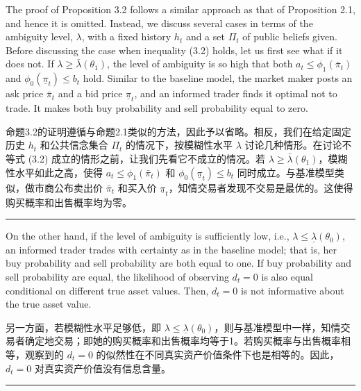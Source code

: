 \documentclass[12pt,a4paper]{article}
\newenvironment{original}{%
  \par\vspace{4pt}\noindent%
  \color{black}%
  \ignorespaces
}{%
  \par\vspace{2pt}%
}
\newenvironment{translation}{%
  \par\vspace{2pt}\noindent%
  \color{transblue}%
  \ignorespaces
}{%
  \par\vspace{4pt}\hrule\vspace{6pt}%
}
\begin{document}
\begin{original}
The proof of Proposition 3.2 follows a similar approach as that of Proposition 2.1, and hence it is omitted. Instead, we discuss several cases in terms of the ambiguity level, $\lambda$, with a fixed history $h_t$ and a set $\Pi_t$ of public beliefs given. Before discussing the case when inequality (3.2) holds, let us first see what if it does not. If $\lambda \geq \bar{\lambda}(\theta_1)$, the level of ambiguity is so high that both $a_t \leq \phi_1(\bar{\pi}_t)$ and $\phi_0(\underline{\pi}_t) \leq b_t$ hold. Similar to the baseline model, the market maker posts an ask price $\bar{\pi}_t$ and a bid price $\underline{\pi}_t$, and an informed trader finds it optimal not to trade. It makes both buy probability and sell probability equal to zero.
\end{original}
\begin{translation}
命题3.2的证明遵循与命题2.1类似的方法，因此予以省略。相反，我们在给定固定历史 $h_t$ 和公共信念集合 $\Pi_t$ 的情况下，按模糊性水平 $\lambda$ 讨论几种情形。在讨论不等式 (3.2) 成立的情形之前，让我们先看它不成立的情况。若 $\lambda \geq \bar{\lambda}(\theta_1)$，模糊性水平如此之高，使得 $a_t \leq \phi_1(\bar{\pi}_t)$ 和 $\phi_0(\underline{\pi}_t) \leq b_t$ 同时成立。与基准模型类似，做市商公布卖出价 $\bar{\pi}_t$ 和买入价 $\underline{\pi}_t$，知情交易者发现不交易是最优的。这使得购买概率和出售概率均为零。
\end{translation}

\begin{original}
On the other hand, if the level of ambiguity is sufficiently low, i.e., $\lambda \leq \underline{\lambda}(\theta_0)$, an informed trader trades with certainty as in the baseline model; that is, her buy probability and sell probability are both equal to one. If buy probability and sell probability are equal, the likelihood of observing $d_t = 0$ is also equal conditional on different true asset values. Then, $d_t = 0$ is not informative about the true asset value.
\end{original}
\begin{translation}
另一方面，若模糊性水平足够低，即 $\lambda \leq \underline{\lambda}(\theta_0)$，则与基准模型中一样，知情交易者确定地交易；即她的购买概率和出售概率均等于1。若购买概率与出售概率相等，观察到的 $d_t = 0$ 的似然性在不同真实资产价值条件下也是相等的。因此，$d_t = 0$ 对真实资产价值没有信息含量。
\end{translation}
\end{document}
